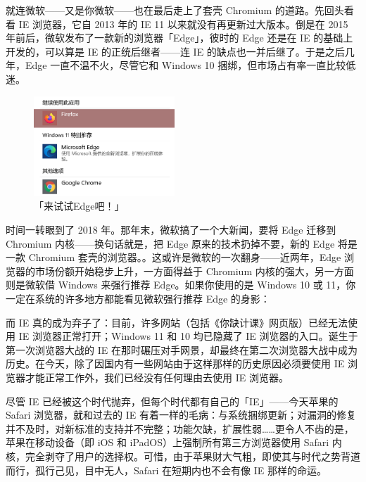 就连微软——又是你微软——也在最后走上了套壳 Chromium 的道路。先回头看看 IE 浏览器，它自 2013 年的 IE 11 以来就没有再更新过大版本。倒是在 2015 年前后，微软发布了一款新的浏览器「Edge」，彼时的 Edge 还是在 IE 的基础上开发的，可以算是 IE 的正统后继者——连 IE 的缺点也一并后继了。于是之后几年，Edge 一直不温不火，尽管它和 Windows 10 捆绑，但市场占有率一直比较低迷。

\begin{figure}
  \centering
  \includegraphics[width=5.3cm]{assets/software/Windows_11_suggesting_Edge.png}
  \caption{「来试试Edge吧！」}
  \label{fig:Windows_11_suggesting_Edge}
\end{figure}

时间一转眼到了 2018 年。那年末，微软搞了一个大新闻，要将 Edge 迁移到 Chromium 内核——换句话就是，把 Edge 原来的技术扔掉不要，新的 Edge 将是一款 Chromium 套壳的浏览器。。这或许是微软的一次翻身——近两年，Edge 浏览器的市场份额开始稳步上升，一方面得益于 Chromium 内核的强大，另一方面则是微软借 Windows 来强行推荐 Edge。如果你使用的是 Windows 10 或 11，你一定在系统的许多地方都能看见微软强行推荐 Edge 的身影：

而 IE 真的成为弃子了：目前，许多网站（包括《你缺计课》网页版）已经无法使用 IE 浏览器正常打开；Windows 11 和 10 均已隐藏了 IE 浏览器的入口。诞生于第一次浏览器大战的 IE 在那时碾压对手网景，却最终在第二次浏览器大战中成为历史。在今天，除了因国内有一些网站由于这样那样的历史原因必须要使用 IE 浏览器才能正常工作外，我们已经没有任何理由去使用 IE 浏览器。

\begin{note}
  尽管 IE 已经被这个时代抛弃，但每个时代都有自己的「IE」——今天苹果的 Safari 浏览器，就和过去的 IE 有着一样的毛病：与系统捆绑更新；对漏洞的修复并不及时，对新标准的支持并不完整；功能欠缺，扩展性弱……更令人不齿的是，苹果在移动设备（即 iOS 和 iPadOS）上强制所有第三方浏览器使用 Safari 内核，完全剥夺了用户的选择权。可惜，由于苹果财大气粗，即使其与时代之势背道而行，孤行己见，目中无人，Safari 在短期内也不会有像 IE 那样的命运。
\end{note}

